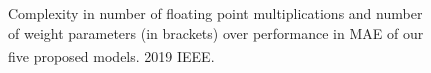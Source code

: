 
\begin{figure}[t]
  \centering
    \begin{adjustbox}{width=0.7\columnwidth}
      
    \end{adjustbox}
    \caption{Complexity in number of floating point multiplications and number of weight parameters (in brackets) over performance in MAE of our five proposed models. \textsuperscript{\textregistered} 2019 IEEE.}%
  \label{fig:complexity}
\end{figure}

